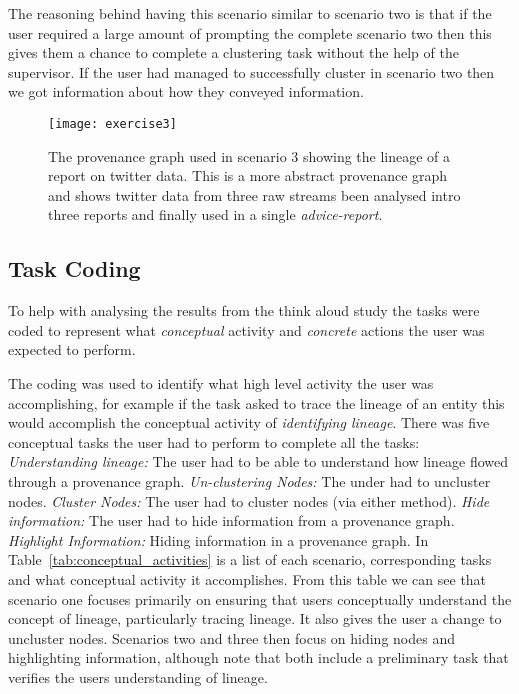 The reasoning behind having this scenario similar to scenario two is that if the user required a large amount of prompting the complete scenario two then this gives them a chance to complete a clustering task without the help of the supervisor. If the user had managed to successfully cluster in scenario two then we got information about how they conveyed information. 

\begin{figure}[h]
	\centering
	\texttt{[image: exercise3]}
	\caption{The provenance graph used in scenario 3 showing the lineage of a report on twitter data. This is a more abstract provenance graph and shows twitter data from three raw streams been analysed intro three reports and finally used in a single \textit{advice-report}.}
	\label{fig:exercise3}
\end{figure}

\subsection{Task Coding}
\label{sub:coding_tasks}

To help with analysing the results from the think aloud study the tasks were coded to represent what \textit{conceptual} activity and \textit{concrete} actions the user was expected to perform. 

The coding was used to identify what high level activity the user was accomplishing, for example if the task asked to trace the lineage of an entity this would accomplish the conceptual activity of \textit{identifying lineage}. There was five conceptual tasks the user had to perform to complete all the tasks: \textit{Understanding lineage:} The user had to be able to understand how lineage flowed through a provenance graph. \textit{Un-clustering Nodes:} The under had to uncluster nodes. \textit{Cluster Nodes:} The user had to cluster nodes (via either method). \textit{Hide information:} The user had to hide information from a provenance graph. \textit{Highlight Information:} Hiding information in a provenance graph. In Table~\ref{tab:conceptual_activities} is a list of each scenario, corresponding tasks and what conceptual activity it accomplishes. From this table we can see that scenario one focuses primarily on ensuring that users conceptually understand the concept of lineage, particularly tracing lineage. It also gives the user a change to uncluster nodes. Scenarios two and three then focus on hiding nodes and highlighting information, although note that both include a preliminary task that verifies the users understanding of lineage.
	
